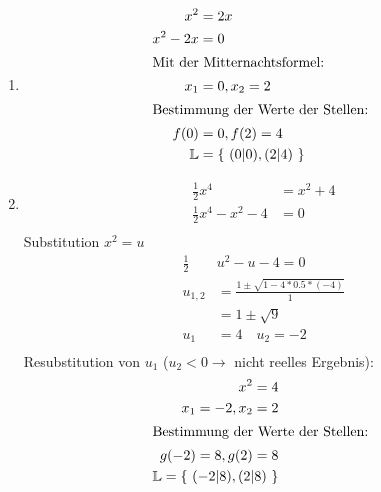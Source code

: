 \begin{lsg}{}
  \begin{multicols}{2}
    \begin{enumerate}
      \item \begin{align*}
        x^2 &= 2x\\
        x^2-2x &= 0\\
        \intertext{Mit der Mitternachtsformel: }
        x_1 &= 0, x_2 =2\\
        \intertext{Bestimmung der Werte der Stellen: }
        f(0) &= 0, f(2) = 4\\
        \mathbb{L} &= \left\{\ (0|0),(2|4) \ \right\}
      \end{align*}

      \columnbreak
      \item
      \begin{align*}
        \frac 1 2 x^4 &= x^2+4\\
        \frac 1 2 x^4 -x^2 -4 &= 0\\
      \end{align*}
      Substitution $x^2=u$
      \begin{align*}
        \frac 1 2& u^2 -u -4 = 0\\
        u_{1,2}&=\frac{1\pm\sqrt{1-4*0.5*(-4)}}{1}\\
        &= 1\pm\sqrt{9}\\
        u_1 &= 4\quad u_2=-2\\
      \end{align*}
      Resubstitution von $u_1$ ($u_2 < 0 \rightarrow $ nicht reelles Ergebnis):
      \begin{align*}
        x^2=4\\
        x_1 = -2, x_2 = 2\\
        \intertext{Bestimmung der Werte der Stellen: }
        g(-2)=8, g(2)=8\\
        \mathbb{L} = \left\{\ (-2|8),(2|8) \ \right\}
      \end{align*}
    \end{enumerate}
  \end{multicols}
\end{lsg}

